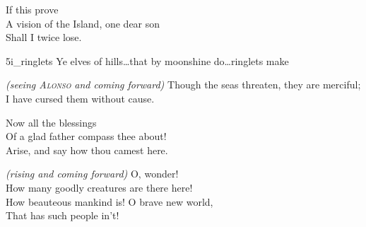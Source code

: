 \begin{verse_speech}[Alonso] 
If this prove\\
A vision of the Island, one dear son\\
Shall I twice lose.
\end{verse_speech}



\begin{pictures} %
	\begin{letter}
		\begin{colorbigpic}
			[1.1]
			{5i_ringlets}
			{Ye elves of hills\dots that by moonshine do\dots ringlets make}
		\end{colorbigpic}
	\end{letter}
\end{pictures}

\begin{verse_speech}[Ferdinand] 
	\textit{(seeing \textsc{Alonso} and coming forward)}
Though the seas threaten, they are merciful;\\
I have cursed them without cause.
\end{verse_speech}


\begin{verse_speech}[Alonso] 
Now all the blessings\\
Of a glad father compass thee about!\\
Arise, and say how thou camest here.
\end{verse_speech}


\begin{verse_speech}[Miranda] 
\textit{(rising and coming forward)} O, wonder!\\
How many goodly creatures are there here!\\
How beauteous mankind is! O brave new world,\\
That has such people in't!
\end{verse_speech}

